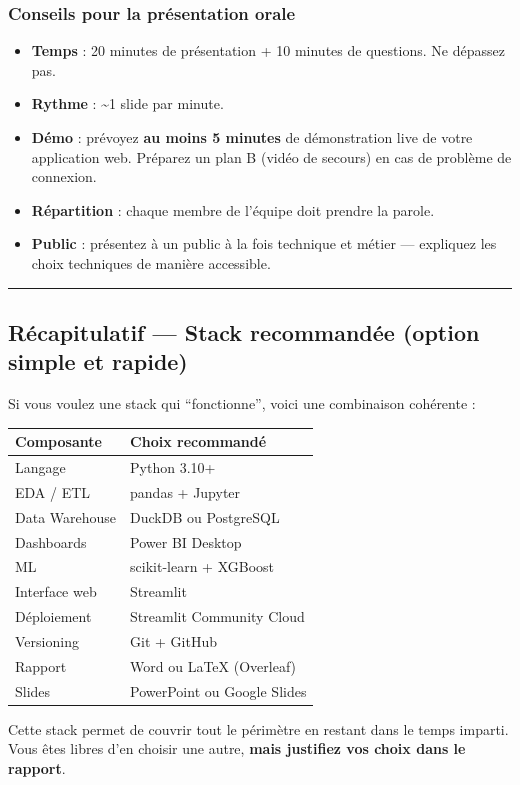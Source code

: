 \documentclass[11pt,a4paper]{article}
\providecommand{\tightlist}{\setlength{\itemsep}{0pt}\setlength{\parskip}{0pt}}
\begin{document}
\subsubsection{Conseils pour la présentation
orale}\label{conseils-pour-la-pruxe9sentation-orale}

\begin{itemize}
\tightlist
\item
  \textbf{Temps} : 20 minutes de présentation + 10 minutes de questions.
  Ne dépassez pas.
\item
  \textbf{Rythme} : \textasciitilde1 slide par minute.
\item
  \textbf{Démo} : prévoyez \textbf{au moins 5 minutes} de démonstration
  live de votre application web. Préparez un plan B (vidéo de secours)
  en cas de problème de connexion.
\item
  \textbf{Répartition} : chaque membre de l'équipe doit prendre la
  parole.
\item
  \textbf{Public} : présentez à un public à la fois technique et métier
  --- expliquez les choix techniques de manière accessible.
\end{itemize}

\begin{center}\rule{0.5\linewidth}{0.5pt}\end{center}

\subsection{Récapitulatif --- Stack recommandée (option simple et
rapide)}\label{ruxe9capitulatif-stack-recommanduxe9e-option-simple-et-rapide}

Si vous voulez une stack qui ``fonctionne'', voici une combinaison
cohérente :

{\def\LTcaptype{none} %
\begin{longtable}[]{@{}ll@{}}
\toprule\noalign{}
Composante & Choix recommandé \\
\midrule\noalign{}
\endhead
\bottomrule\noalign{}
\endlastfoot
Langage & Python 3.10+ \\
EDA / ETL & pandas + Jupyter \\
Data Warehouse & DuckDB ou PostgreSQL \\
Dashboards & Power BI Desktop \\
ML & scikit-learn + XGBoost \\
Interface web & Streamlit \\
Déploiement & Streamlit Community Cloud \\
Versioning & Git + GitHub \\
Rapport & Word ou LaTeX (Overleaf) \\
Slides & PowerPoint ou Google Slides \\
\end{longtable}
}

Cette stack permet de couvrir tout le périmètre en restant dans le temps
imparti. Vous êtes libres d'en choisir une autre, \textbf{mais justifiez
vos choix dans le rapport}.
\end{document}
